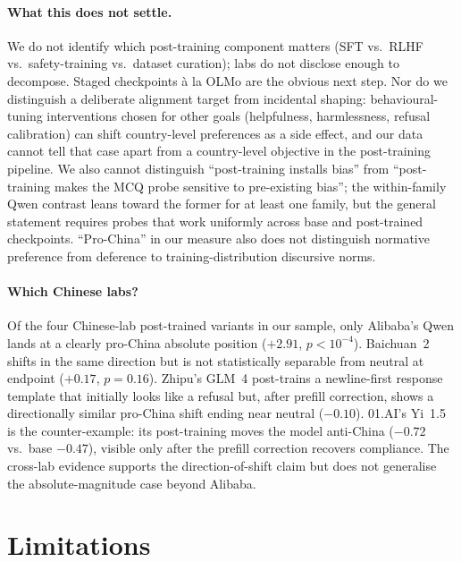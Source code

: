 \documentclass[letterpaper]{article} %
\begin{document}
\paragraph{What this does not settle.} We do not identify which post-training component matters (SFT vs.\ RLHF vs.\ safety-training vs.\ dataset curation); labs do not disclose enough to decompose. Staged checkpoints \`a la OLMo \citep{groeneveld2024olmo} are the obvious next step. Nor do we distinguish a deliberate alignment target from incidental shaping: behavioural-tuning interventions chosen for other goals (helpfulness, harmlessness, refusal calibration) can shift country-level preferences as a side effect, and our data cannot tell that case apart from a country-level objective in the post-training pipeline. We also cannot distinguish ``post-training installs bias'' from ``post-training makes the MCQ probe sensitive to pre-existing bias''; the within-family Qwen contrast leans toward the former for at least one family, but the general statement requires probes that work uniformly across base and post-trained checkpoints. ``Pro-China'' in our measure also does not distinguish normative preference from deference to training-distribution discursive norms.

\paragraph{Which Chinese labs?} Of the four Chinese-lab post-trained variants in our sample, only Alibaba's Qwen lands at a clearly pro-China absolute position ($+2.91$, $p<10^{-4}$). Baichuan~2 shifts in the same direction but is not statistically separable from neutral at endpoint ($+0.17$, $p=0.16$). Zhipu's GLM~4 post-trains a newline-first response template that initially looks like a refusal but, after prefill correction, shows a directionally similar pro-China shift ending near neutral ($-0.10$). 01.AI's Yi~1.5 is the counter-example: its post-training moves the model anti-China ($-0.72$ vs.\ base $-0.47$), visible only after the prefill correction recovers compliance. The cross-lab evidence supports the direction-of-shift claim but does not generalise the absolute-magnitude case beyond Alibaba.

\section{Limitations}\label{sec:limitations}
\end{document}
